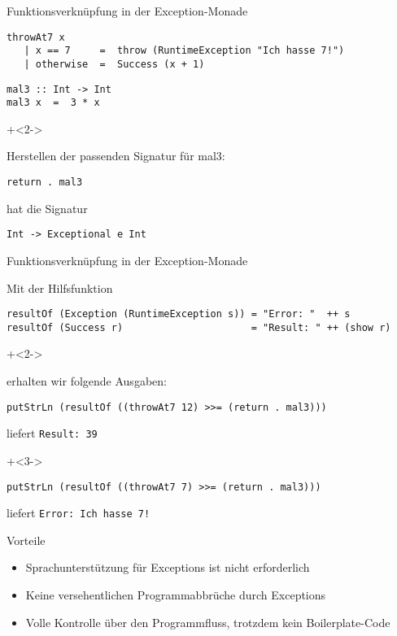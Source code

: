 \begin{frame}[fragile]{Funktionsverknüpfung in der Exception-Monade}
\begin{lstlisting}
throwAt7 x
   | x == 7     =  throw (RuntimeException "Ich hasse 7!")
   | otherwise  =  Success (x + 1)
\end{lstlisting}

\begin{lstlisting}
mal3 :: Int -> Int
mal3 x  =  3 * x
\end{lstlisting}

\onslide+<2->

Herstellen der passenden Signatur für mal3:

\begin{lstlisting}
return . mal3
\end{lstlisting}

hat die Signatur

\begin{lstlisting}
Int -> Exceptional e Int
\end{lstlisting}

\end{frame}


\begin{frame}[fragile]{Funktionsverknüpfung in der Exception-Monade}

Mit der Hilfsfunktion
\begin{lstlisting}
resultOf (Exception (RuntimeException s)) = "Error: "  ++ s
resultOf (Success r)                      = "Result: " ++ (show r)
\end{lstlisting}

\onslide+<2->

erhalten wir folgende Ausgaben:

\begin{lstlisting}
putStrLn (resultOf ((throwAt7 12) >>= (return . mal3)))
\end{lstlisting}
liefert \lstinline|Result: 39|

\onslide+<3->

\begin{lstlisting}
putStrLn (resultOf ((throwAt7 7) >>= (return . mal3)))
\end{lstlisting}
liefert \lstinline|Error: Ich hasse 7!|


\end{frame}

\begin{frame}[fragile]{Vorteile}

\begin{itemize}
\item Sprachunterstützung für Exceptions ist nicht erforderlich
\item Keine versehentlichen Programmabbrüche durch Exceptions
\item Volle Kontrolle über den Programmfluss, trotzdem kein Boilerplate-Code
\end{itemize}

\end{frame}


